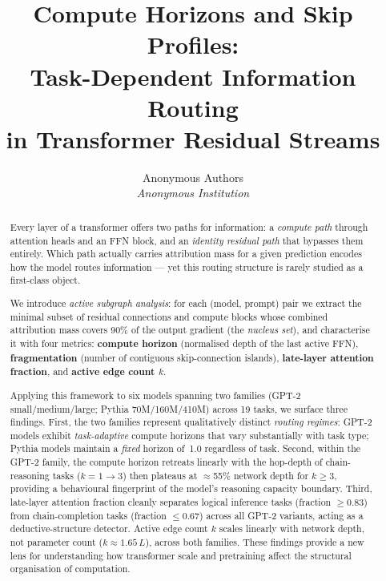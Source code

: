 \documentclass{article}
\title{Compute Horizons and Skip Profiles:\\
Task-Dependent Information Routing\\
in Transformer Residual Streams}
\author{%
  Anonymous Authors\\
  \textit{Anonymous Institution}\\
}
\begin{document}
\maketitle

\begin{abstract}
Every layer of a transformer offers two paths for information: a
\emph{compute path} through attention heads and an FFN block, and an
\emph{identity residual path} that bypasses them entirely.
Which path actually carries attribution mass for a given prediction
encodes how the model routes information — yet this routing structure
is rarely studied as a first-class object.

We introduce \emph{active subgraph analysis}: for each (model, prompt)
pair we extract the minimal subset of residual connections and compute
blocks whose combined attribution mass covers 90\% of the output
gradient (the \emph{nucleus set}), and characterise it with four
metrics: \textbf{compute horizon} (normalised depth of the last active
FFN), \textbf{fragmentation} (number of contiguous skip-connection
islands), \textbf{late-layer attention fraction}, and \textbf{active
edge count $k$}.

Applying this framework to six models spanning two families
(GPT-2 small/medium/large; Pythia 70M/160M/410M) across 19 tasks, we
surface three findings.
First, the two families represent qualitatively distinct
\emph{routing regimes}: GPT-2 models exhibit \emph{task-adaptive}
compute horizons that vary substantially with task type; Pythia models
maintain a \emph{fixed} horizon of~1.0 regardless of task.
Second, within the GPT-2 family, the compute horizon retreats linearly
with the hop-depth of chain-reasoning tasks ($k\!=\!1\!\to\!3$) then
plateaus at $\approx$55\% network depth for $k\!\geq\!3$, providing a
behavioural fingerprint of the model's reasoning capacity boundary.
Third, late-layer attention fraction cleanly separates logical
inference tasks (fraction $\geq\!0.83$) from chain-completion tasks
(fraction $\leq\!0.67$) across all GPT-2 variants, acting as a
deductive-structure detector.
Active edge count $k$ scales linearly with network depth, not parameter
count ($k\!\approx\!1.65\,L$), across both families.
These findings provide a new lens for understanding how transformer
scale and pretraining affect the structural organisation of computation.
\end{abstract}
\end{document}
